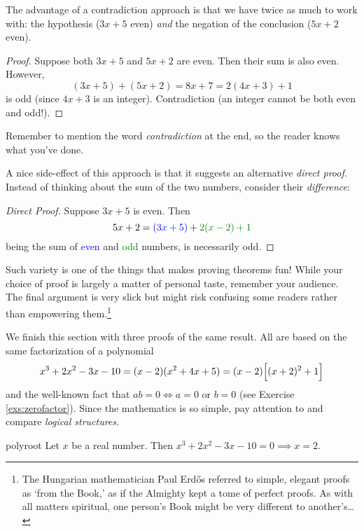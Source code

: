 The advantage of a contradiction approach is that we have twice as much to work with: the hypothesis ($3x+5$ even) \emph{and} the negation of the conclusion ($5x+2$ even).

\begin{proof}
	Suppose both $3x+5$ and $5x+2$ are even. Then their sum is also even. However,
  \[
  	(3x+5)+(5x+2)=8x+7=2(4x+3)+1
  \]
  is odd (since $4x+3$ is an integer). Contradiction (an integer cannot be both even and odd!).
\end{proof}

Remember to mention the word \emph{contradiction} at the end, so the reader knows what you've done.\smallbreak

A nice side-effect of this approach is that it suggests an alternative \emph{direct proof.} Instead of thinking about the sum of the two numbers, consider their \emph{difference}:

\begin{proof}[Direct Proof]
	Suppose $3x+5$ is even. Then
	\[
		5x+2= \textcolor{blue}{(3x+5)}+\textcolor{Green}{2(x-2)+1}
	\]
	being the sum of \textcolor{blue}{even} and \textcolor{Green}{odd} numbers, is necessarily odd.
\end{proof}

\goodbreak

Such variety is one of the things that makes proving theorems fun! While your choice of proof is largely a matter of personal taste, remember your audience. The final argument is very slick but might risk confusing some readers rather than empowering them.\footnote{The Hungarian mathematician Paul Erdős referred to simple, elegant proofs as `from the Book,' as if the  Almighty kept a tome of perfect proofs. As with all matters spiritual, one person's Book might be very different to another's\ldots} 



We finish this section with three proofs of the same result. All are based on the same factorization of a polynomial
\[
	x^3+2x^2-3x-10=(x-2)(x^2+4x+5)=(x-2)\Bigl[(x+2)^2+1\Bigr]
\]
and the well-known fact that $ab=0\iff a=0$ or $b=0$ (see Exercise \ref{exs:zerofactor}). Since the mathematics is so simple, pay attention to and compare \emph{logical structures.}

\begin{thm}{}{polyroot}
	Let $x$ be a real number. Then $x^3+2x^2-3x-10=0\implies x=2$.
\end{thm}

